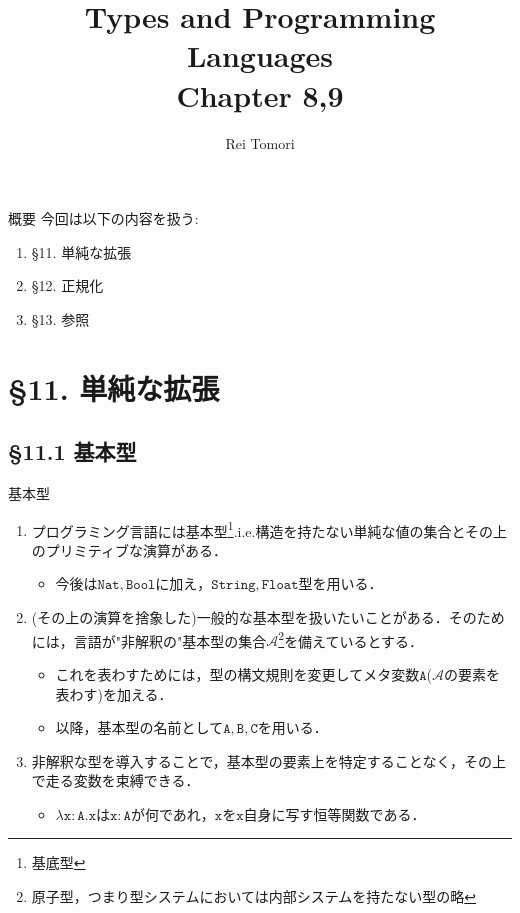 \documentclass[9pt]{beamer}
\title{Types and Programming Languages\\ Chapter 8,9}
\author{Rei Tomori}
\begin{document}
\maketitle
\begin{frame}{概要}
	今回は以下の内容を扱う: \begin{enumerate}
        \item \S 11. 単純な拡張
        \item \S 12. 正規化
        \item \S 13. 参照
    \end{enumerate}
\end{frame}
\section{\S11. 単純な拡張}
\subsection{\S11.1 基本型}
\begin{frame}{基本型}
    \begin{enumerate}
    \item プログラミング言語には基本型\footnote{基底型}.i.e.構造を持たない単純な値の集合とその上のプリミティブな演算がある．\begin{itemize}
    \item 今後は$\mathtt{Nat, Bool}$に加え，$\mathtt{String, Float}$型を用いる．
    \end{itemize}
    \item (その上の演算を捨象した)一般的な基本型を扱いたいことがある．そのためには，言語が"非解釈の"基本型の集合$\mathscr{A}$\footnote{原子型，つまり型システムにおいては内部システムを持たない型の略}を備えているとする．\begin{itemize}
    \item これを表わすためには，型の構文規則を変更してメタ変数$\mathtt{A}$($\mathscr{A}$の要素を表わす)を加える．
    \item 以降，基本型の名前として$\mathtt{A, B, C}$を用いる．
    \end{itemize}
    \item 非解釈な型を導入することで，基本型の要素上を特定することなく，その上で走る変数を束縛できる．\begin{itemize}
    \item $\mathtt{\lambda x:A. x}$は$\mathtt{x:A}$が何であれ，$\mathtt{x}$を$\mathtt{x}$自身に写す恒等関数である．
    \end{itemize}
    \end{enumerate}
\end{frame}
\end{document}
